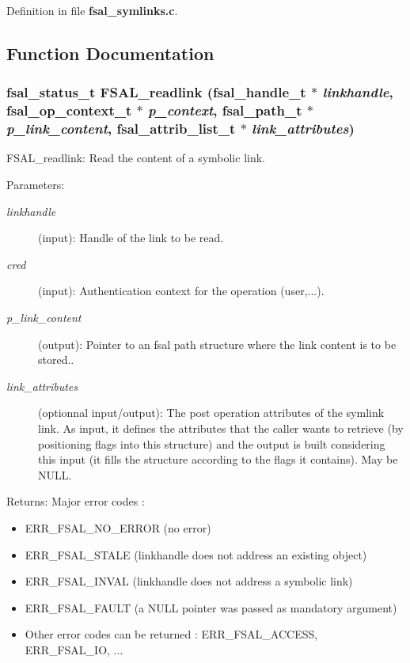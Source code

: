 Definition in file {\bf fsal\_\-symlinks.c}.

\subsection{Function Documentation}
\subsubsection[{FSAL\_\-readlink}]{\setlength{\rightskip}{0pt plus 5cm}fsal\_\-status\_\-t FSAL\_\-readlink (fsal\_\-handle\_\-t $\ast$ {\em linkhandle}, \/  fsal\_\-op\_\-context\_\-t $\ast$ {\em p\_\-context}, \/  fsal\_\-path\_\-t $\ast$ {\em p\_\-link\_\-content}, \/  fsal\_\-attrib\_\-list\_\-t $\ast$ {\em link\_\-attributes})}\label{fsal__symlinks_8c_4170bc0feb29c36be1cd175a3b792880}


FSAL\_\-readlink: Read the content of a symbolic link.

\begin{Desc}
\item[Parameters:]
\begin{description}
\item[{\em linkhandle}](input): Handle of the link to be read. \item[{\em cred}](input): Authentication context for the operation (user,...). \item[{\em p\_\-link\_\-content}](output): Pointer to an fsal path structure where the link content is to be stored.. \item[{\em link\_\-attributes}](optionnal input/output): The post operation attributes of the symlink link. As input, it defines the attributes that the caller wants to retrieve (by positioning flags into this structure) and the output is built considering this input (it fills the structure according to the flags it contains). May be NULL.\end{description}
\end{Desc}
\begin{Desc}
\item[Returns:]Major error codes :\begin{itemize}
\item ERR\_\-FSAL\_\-NO\_\-ERROR (no error)\item ERR\_\-FSAL\_\-STALE (linkhandle does not address an existing object)\item ERR\_\-FSAL\_\-INVAL (linkhandle does not address a symbolic link)\item ERR\_\-FSAL\_\-FAULT (a NULL pointer was passed as mandatory argument)\item Other error codes can be returned : ERR\_\-FSAL\_\-ACCESS, ERR\_\-FSAL\_\-IO, ... \end{itemize}
\end{Desc}


